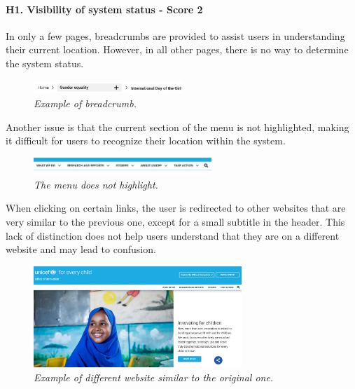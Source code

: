 \paragraph{H1. Visibility of system status - Score 2} \label{subsec:H1}	In only a few pages, breadcrumbs are provided to assist users in understanding their current location. However, in all other pages, there is no way to determine the system status.
\begin{figure}[!h]
	\begin{center}
		\includegraphics[width=0.5\textwidth]{FinalScores1.jpg}
		\captionsetup{font=small}
		\caption{\textit{Example of breadcrumb.}}
	\end{center}
\end{figure}
\newline Another issue is that the current section of the menu is not highlighted, making it difficult for users to recognize their location within the system.
\begin{figure}[!h]
	\begin{center}
		\includegraphics[width=0.6\textwidth]{FinalScores2.jpg}
		\captionsetup{font=small}
		\caption{\textit{The menu does not highlight.}}
	\end{center}
\end{figure}
\newline When clicking on certain links, the user is redirected to other websites that are very similar to the previous one, except for a small subtitle in the header. This lack of distinction does not help users understand that they are on a different website and may lead to confusion.
\begin{figure}[!h]
	\begin{center}
		\includegraphics[width=0.7\textwidth]{FinalScores3.jpg}
		\captionsetup{font=small}
		\caption{\textit{Example of different website similar to the original one.}}
	\end{center}
\end{figure}
\newline
